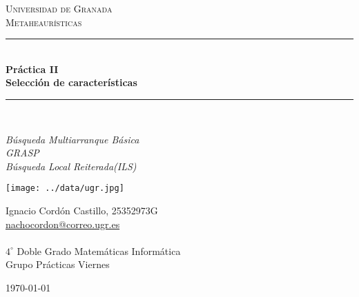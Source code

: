 \documentclass[a4paper,11pt]{article}
\begin{document}
\begin{titlepage}

\newcommand{\HRule}{\rule{\linewidth}{0.5mm}} %

\center %
 
\textsc{\LARGE Universidad de Granada}\\[1.5cm]
\textsc{\Large Metaheaurísticas}\\[0.5cm] 

\bigskip
\HRule \\[0.4cm]
{ \huge \bfseries Práctica II}\\[0.4cm] %
{ \huge \bfseries Selección de características}\\
\HRule \\[1.5cm]
 

\begin{minipage}{\textwidth}
\begin{center} \large
\emph{Búsqueda Multiarranque Básica}\\
\emph{GRASP}\\
\emph{Búsqueda Local Reiterada(ILS)}\\
\end{center}
\end{minipage}


\begin{center}
\texttt{[image: ../data/ugr.jpg]}
\end{center}

\begin{minipage}{\textwidth}
\begin{center} \large
Ignacio Cordón Castillo, 25352973G\\
\url{nachocordon@correo.ugr.es}\\
\ \\
$4^{\circ}$ Doble Grado Matemáticas Informática\\
Grupo Prácticas Viernes
\end{center}
\end{minipage}


\vspace{\fill}%
\large\today
\end{titlepage}  
\end{document}
